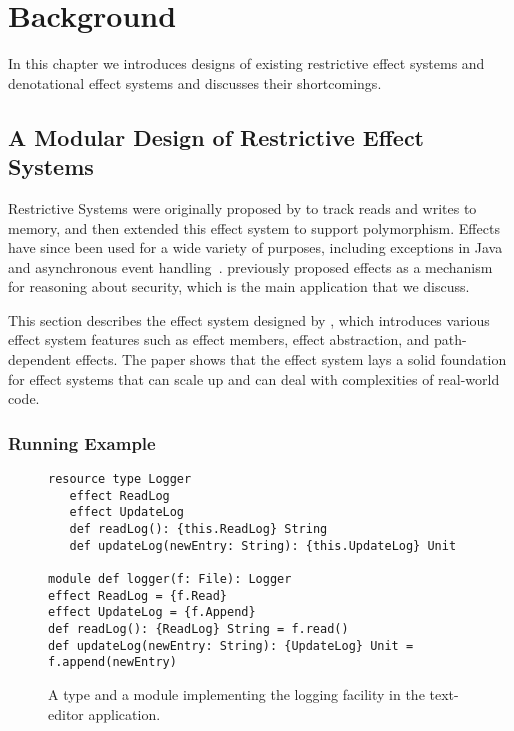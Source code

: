 

\chapter{Background}

In this chapter we introduces designs of existing restrictive effect systems and denotational effect systems and discusses their shortcomings.

\label{chapter-background}
\section{A Modular Design of Restrictive Effect Systems}

\label{sec:wyvern-effects-basics}


Restrictive Systems were originally proposed by \citet{lucassen87} to track reads and writes to memory, and then \citet{lucassen88} extended this effect system to support polymorphism.  Effects have since been used for a wide variety of purposes, including exceptions in Java~\cite{kiniry06} and asynchronous event handling~\cite{bracevac18}. \citet{turbak08} previously proposed effects as a mechanism for reasoning about security, which is the main application that we discuss.

This section describes the effect system designed by \citet{melicher20}, which introduces various effect system features such as effect members, effect abstraction, and path-dependent effects. The paper shows that the effect system lays a solid foundation for effect systems that can scale up and can deal with complexities of real-world code.



\subsection{Running Example}
\begin{figure}[t]
\begin{lstlisting}
resource type Logger
   effect ReadLog
   effect UpdateLog
   def readLog(): {this.ReadLog} String
   def updateLog(newEntry: String): {this.UpdateLog} Unit

module def logger(f: File): Logger
effect ReadLog = {f.Read}
effect UpdateLog = {f.Append}
def readLog(): {ReadLog} String = f.read()
def updateLog(newEntry: String): {UpdateLog} Unit = f.append(newEntry)
\end{lstlisting}
\caption{A type and a module implementing the logging facility in the text-editor application.}
\label{f-logger}
\end{figure}

